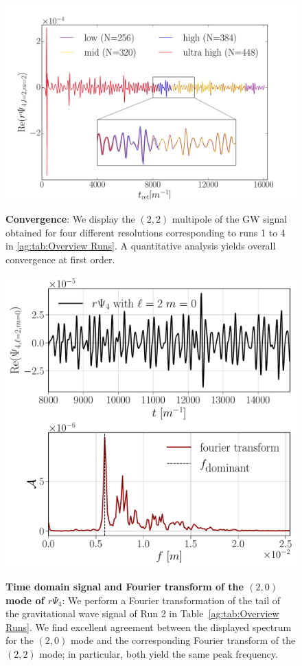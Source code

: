 \begin{figure}[h!]
\begin{center}
{\includegraphics[width=0.8\columnwidth]{ag_fig/Convergence.pdf}}
\caption{{\bf Convergence}: We display the $(2,2)$ multipole
of the GW signal obtained for four different resolutions
corresponding to runs 1 to 4 in \ref{ag:tab:Overview Runs}.
A quantitative analysis yields overall convergence at
first order.
    }
\label{ag:fig:Convergence}
\end{center}
\end{figure}



\begin{figure}[h!]
\begin{center}
{\includegraphics[width=0.7\columnwidth]{ag_fig/FFT_analysis.pdf}}
\caption{{\bf Time domain signal and
    Fourier transform of the $(2,0)$ mode
    of $r\Psi_4$}: We perform a Fourier
    transformation of the tail of the gravitational wave signal of Run 2 in Table~\ref{ag:tab:Overview Runs}.
    We find excellent agreement between the displayed
    spectrum for the $(2,0)$ mode and the corresponding Fourier transform of the $(2,2)$ mode; in particular, both yield the same peak frequency. 
    }
\label{ag:fig:Fourier}
\end{center}
\end{figure}


